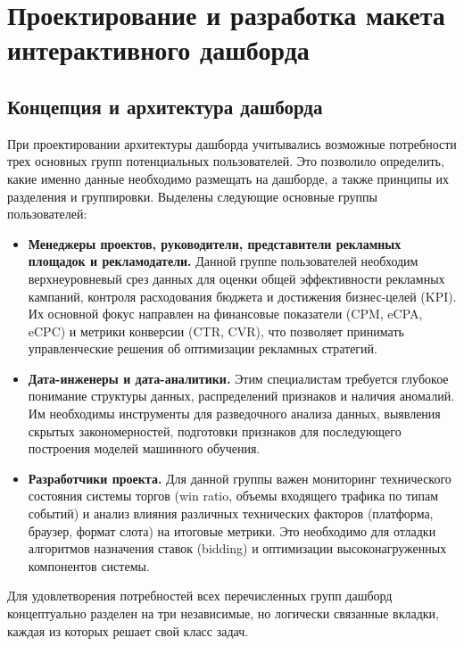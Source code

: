 \section{Проектирование и разработка макета интерактивного дашборда}
\label{sec:dashboard_design}

\subsection{Концепция и архитектура дашборда}
\label{subsec:dashboard_architecture}

При проектировании архитектуры дашборда учитывались возможные потребности трех основных групп потенциальных пользователей. Это позволило определить, какие именно данные необходимо размещать на дашборде, а также принципы их разделения и группировки. Выделены следующие основные группы пользователей:

\begin{itemize}
    \item \textbf{Менеджеры проектов, руководители, представители рекламных площадок и рекламодатели.} Данной группе пользователей необходим верхнеуровневый срез данных для оценки общей эффективности рекламных кампаний, контроля расходования бюджета и достижения бизнес-целей (KPI). Их основной фокус направлен на финансовые показатели (CPM, eCPA, eCPC) и метрики конверсии (CTR, CVR), что позволяет принимать управленческие решения об оптимизации рекламных стратегий.
    \item \textbf{Дата-инженеры и дата-аналитики.} Этим специалистам требуется глубокое понимание структуры данных, распределений признаков и наличия аномалий. Им необходимы инструменты для разведочного анализа данных, выявления скрытых закономерностей, подготовки признаков для последующего построения моделей машинного обучения.
    \item \textbf{Разработчики проекта.} Для данной группы важен мониторинг технического состояния системы торгов (win ratio, объемы входящего трафика по типам событий) и анализ влияния различных технических факторов (платформа, браузер, формат слота) на итоговые метрики. Это необходимо для отладки алгоритмов назначения ставок (bidding) и оптимизации высоконагруженных компонентов системы.
\end{itemize}

Для удовлетворения потребностей всех перечисленных групп дашборд концептуально разделен на три независимые, но логически связанные вкладки, каждая из которых решает свой класс задач.

